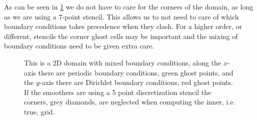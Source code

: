 		As can be seen in \cref{fig:mixed} we do not have to care for the corners
		of the domain, as long as we are using a  \(7\)-point stencil. This allows us to not
		need to care of which boundary conditions takes precedence when they clash.
		For a higher order, or different, stencils the corner ghost cells may be important
		and the mixing of boundary conditions need to be given extra care.

		\begin{figure}
			\centering
			
			\caption{This is a \(2\)D domain with mixed boundary conditions, along the $x$-axis there are
			periodic boundary conditions, green ghost points, and the $y$-axis there are Dirichlet boundary conditions, red ghost points. If
			the smoothers are using a 5 point discretization stencil the corners, grey diamonds, are neglected when
			computing the inner, i.e. true,  grid.}
			\label{fig:mixed}
		\end{figure}
